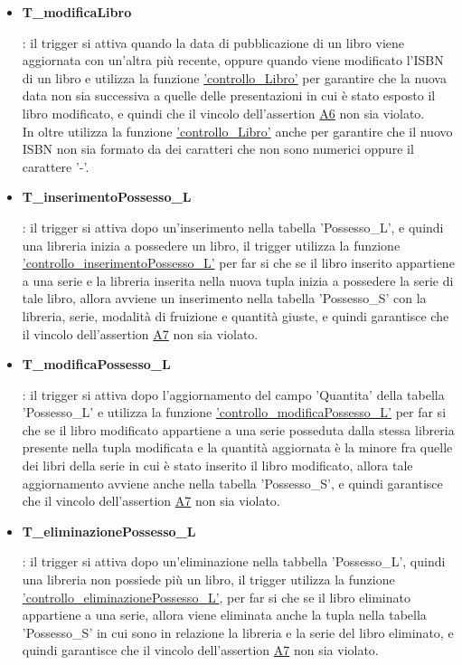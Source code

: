 \documentclass{article}
\begin{document}
\begin{itemize}
   \item \hypertarget{t17}{\textbf{T\_modificaLibro}}: il trigger si attiva quando la data di pubblicazione di un libro viene aggiornata con un'altra più recente, oppure quando viene modificato l'ISBN di un libro e utilizza la funzione \hyperlink{f17}{'controllo\_Libro'} per garantire che la nuova data non sia successiva a quelle delle presentazioni in cui è stato esposto il libro modificato, e quindi che il vincolo dell'assertion \hyperlink{assertion6}{A6} non sia violato.\\
   In oltre utilizza la funzione \hyperlink{f17}{'controllo\_Libro'} anche per garantire che il nuovo ISBN non sia formato da dei caratteri che non sono numerici oppure il carattere '-'.

   \item \hypertarget{t18}{\textbf{T\_inserimentoPossesso\_L}}: il trigger si attiva dopo un'inserimento nella tabella 'Possesso\_L', e quindi una libreria inizia a possedere un libro, il trigger utilizza la funzione \hyperlink{f18}{'controllo\_inserimentoPossesso\_L'} per far si che se il libro inserito appartiene a una serie e la libreria inserita nella nuova tupla inizia a possedere la serie di tale libro, allora avviene un inserimento nella tabella 'Possesso\_S' con la libreria, serie, modalità di fruizione e quantità giuste, e quindi garantisce che il vincolo dell'assertion \hyperlink{assertion7}{A7} non sia violato. 

   \item \hypertarget{t19}{\textbf{T\_modificaPossesso\_L}}: il trigger si attiva dopo l'aggiornamento del campo 'Quantita' della tabella 'Possesso\_L' e utilizza la funzione \hyperlink{f19}{'controllo\_modificaPossesso\_L'} per far si che se il libro modificato appartiene a una serie posseduta dalla stessa libreria presente nella tupla modificata e la quantità aggiornata è la minore fra quelle dei libri della serie in cui è stato inserito il libro modificato, allora tale aggiornamento avviene anche nella tabella 'Possesso\_S', e quindi garantisce che il vincolo dell'assertion \hyperlink{assertion7}{A7} non sia violato.

   \item \hypertarget{t20}{\textbf{T\_eliminazionePossesso\_L}}: il trigger si attiva dopo un'eliminazione nella tabbella 'Possesso\_L', quindi una libreria non possiede più un libro, il trigger utilizza la funzione \hyperlink{f20}{'controllo\_eliminazionePossesso\_L'}, per far si che se il libro eliminato appartiene a una serie, allora viene eliminata anche la tupla nella tabella 'Possesso\_S' in cui sono in relazione la libreria e la serie del libro eliminato, e quindi garantisce che il vincolo dell'assertion \hyperlink{assertion7}{A7} non sia violato.


\end{itemize}
\end{document}
